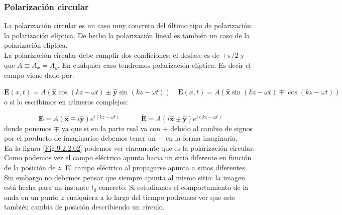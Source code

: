 \documentclass[12pt,a4paper]{article}
\newcommand{\tquad}{\quad \quad \quad}
\newcommand{\En}{\mathbf{E}}
\newcommand{\hnx}{\hat{\mathbf{x}}}
\newcommand{\hny}{\hat{\mathbf{y}}}
\numberwithin{equation}{section}
\numberwithin{figure}{section}
\begin{document}
\subsubsection{Polarización circular}

La polarización circular es un caso muy concreto del último tipo de polarización: la polarización elíptica. De hecho la polarización lineal es también un caso de la polarización elíptica.  \\

La polarización circular debe cumplir dos condiciones: el desfase es de $\pm \pi/2$ y que $A\equiv A_x=A_y$. En cualquier caso tendremos polarización elíptica. Es decir el campo viene dado por:

\begin{equation}
\En(x,t) = A (\hnx \cos(kz-\omega t) \pm \hny \sin (kz-\omega t))  \quad \dot{\En} (x,t) = A (\hnx \sin (kz-\omega t) \mp \cos (kz-\omega t)) \label{Ec:09.2.2.07}
\end{equation}
o si lo escribimos en números complejos:

\begin{equation}
\En = A(\hnx \mp i\hny) e^{i (kz-\omega t)} \tquad \dot{\En} = A ( i \hnx \pm \hny) e^{i (kz-\omega t)} \label{Ec:09.2.2.08}
\end{equation}
donde ponemos $\mp$ ya que si en la parte real va con $+$ debido al cambio de signos por el producto de imaginarios debemos tener un $-$ en la forma imaginaria. \\

En la figura \ref{Fig:9.2.2.02} podemos ver claramente que es la polarización circular. Como podemos ver el campo eléctrico apunta hacia un sitio diferente en función de la posición de $z$. El campo eléctrico al propagarse apunta a sitios diferentes. Sin embargo no debemos pensar que siempre apunta al mismo sitio: la imagen está hecha para un instante $t_0$ concreto. Si estudiamos el comportamiento de la onda en un punto $z$ cualquiera a lo largo del tiempo podremos ver que este también cambia de posición describiendo un círculo.
\end{document}
